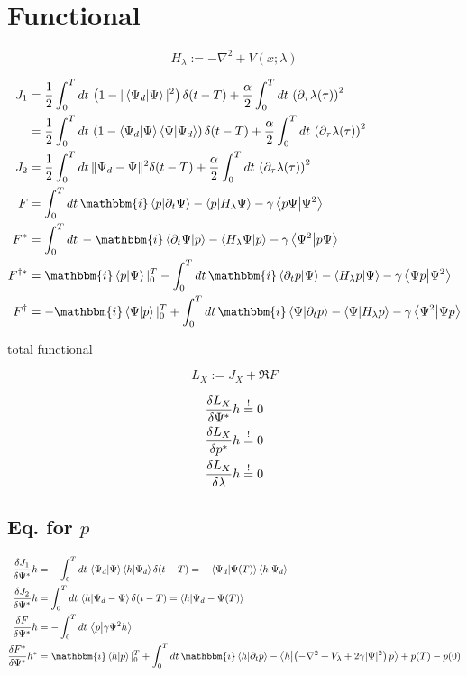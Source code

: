 \documentclass[10pt,a4paper]{article}
\newcommand{\iu}{\ensuremath{\mathbbm{i}}}
\newcommand{\intT}{\ensuremath{\int_0^T dt\,}}
\newcommand{\skalarprodukt}[2]{\left< #1 \vert #2 \right>}
\newcommand{\Hlam}{\ensuremath{H_{\lambda}}}
\begin{document}
\section{Functional}

\begin{equation}
\Hlam := -\nabla^2 + V(x;\lambda)
\end{equation}

\begin{align}
J_1 &= \frac{1}{2} \intT \left( 1 - \vert\skalarprodukt{\Psi_d}{\Psi}\vert^2 \right) \delta(t-T) + \frac{\alpha}{2} \intT \left( \partial_{\tau} \lambda(\tau) \right)^2 \\
&= \frac{1}{2} \intT \left( 1 - \braket{\Psi_d}{\Psi}\braket{\Psi}{\Psi_d} \right) \delta(t-T) + \frac{\alpha}{2} \intT \left( \partial_{\tau} \lambda(\tau) \right)^2 \\
J_2 &= \frac{1}{2} \intT \Vert\Psi_d-\Psi\Vert^2 \delta(t-T) + \frac{\alpha}{2} \intT \left( \partial_{\tau} \lambda(\tau) \right)^2 \\
F &= \intT \iu \braket{p}{\partial_t\Psi} - \braket{p}{\Hlam\Psi} - \gamma \braket{p \Psi}{\Psi^2} \\
F^* &= \intT -\iu \braket{\partial_t\Psi}{p} - \braket{\Hlam\Psi}{p} - \gamma \braket{\Psi^2}{p \Psi} \\
F^{\dagger *} &= \iu \braket{p}{\Psi}\vert_{0}^{T} - \intT \iu \braket{\partial_t p}{\Psi} - \braket{\Hlam p}{\Psi} - \gamma \braket{\Psi p}{\Psi^2} \\
F^{\dagger} &= -\iu \braket{\Psi}{p}\vert_{0}^{T} + \intT \iu \braket{\Psi}{\partial_t p} - \braket{\Psi}{\Hlam p} - \gamma \braket{\Psi^2}{\Psi p}
\end{align}

total functional

\begin{equation}
L_X := J_X + \Re{F}
\end{equation}

\begin{align}
\fdv{L_X}{\Psi^*} h &\stackrel{!}{=} 0 \\
\fdv{L_X}{p^*} h &\stackrel{!}{=} 0 \\
\fdv{L_X}{\lambda} h &\stackrel{!}{=} 0 
\end{align}

\subsection{Eq. for $p$}

\begin{align}
\fdv{J_1}{\Psi^*} h &= -\intT \braket{\Psi_d}{\Psi}\braket{h}{\Psi_d} \delta(t-T) = -\braket{\Psi_d}{\Psi(T)}\braket{h}{\Psi_d} \\
\fdv{J_2}{\Psi^*} h &= \intT \braket{h}{\Psi_d-\Psi} \delta(t-T) = \braket{h}{\Psi_d-\Psi(T)} \\
\fdv{F}{\Psi^*} h &= -\intT \braket{p}{\gamma\Psi^2 h} \\
\fdv{F^*}{\Psi^*} h^* &= \iu \braket{h}{p}\vert_{0}^{T} + \intT \iu \braket{h}{\partial_t p} - \braket{h}{\left( -\laplacian + V_{\lambda} + 2 \gamma \vert \Psi \vert^2 \right)p} + p(T) - p(0)
\end{align}
\end{document}
